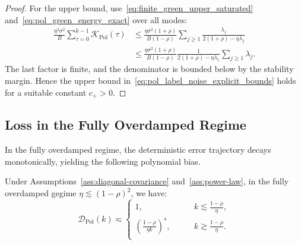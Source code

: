\begin{proof}
For the upper bound, use~\eqref{eq:finite_green_upper_saturated} and~\eqref{eq:pol_green_energy_exact} over all modes:
\begin{align*}
    \frac{\eta^2\sigma^2}{B}\sum_{\tau=0}^{k-1}\mathcal K_{\mathrm{Pol}}(\tau)
    &\le
    \frac{\eta\sigma^2(1+\rho)}{B(1-\rho)}
    \sum_{j\ge1}\frac{\lambda_j}{2(1+\rho)-\eta\lambda_j} \\
    &\le
    \frac{\eta\sigma^2(1+\rho)}{B(1-\rho)}
    \frac{1}{2(1+\rho)-\eta\lambda_1}
    \sum_{j\ge1}\lambda_j.
\end{align*}
The last factor is finite, and the denominator is bounded below by the stability margin. Hence the upper bound in~\eqref{eq:pol_label_noise_explicit_bounds} holds for a suitable constant $c_+>0$.
\end{proof}

\subsection{Loss in the Fully Overdamped Regime}
\label{app:pol_fully_overdamped_loss}

In the fully overdamped regime, the deterministic error trajectory decays monotonically, yielding the following polynomial bias.

\begin{proposition}
\label{prop:pol_deterministic_bias0}
Under Assumptions~\ref{ass:diagonal-covariance} and~\ref{ass:power-law}, in the fully overdamped gegime
$\eta\lesssim (1-\rho)^2$, we have:
\begin{equation*}
    \mathcal{D}_{\mathrm{Pol}}(k)
    \eqsim
    \begin{cases}
    1,&\qquad k\lesssim \frac{1-\rho}{\eta},\\
    \left(\frac{1-\rho}{\eta k}\right)^s, &\qquad k\gtrsim\frac{1-\rho}{\eta}.\\
    \end{cases}
\end{equation*}
\end{proposition}

